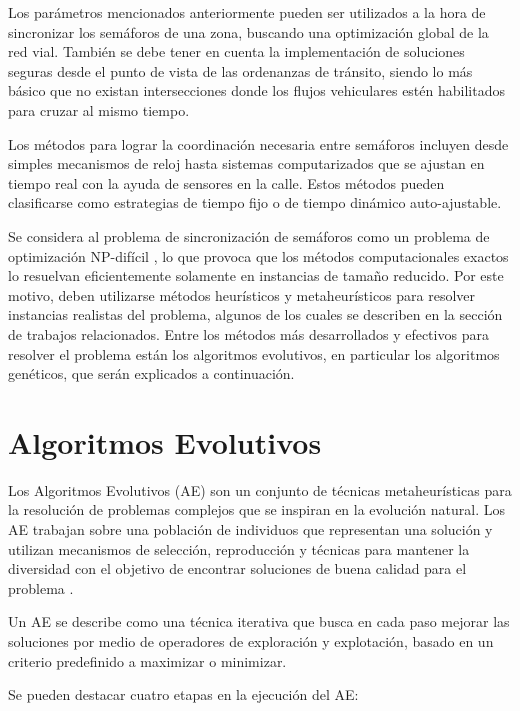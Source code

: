 Los parámetros mencionados anteriormente pueden ser utilizados a la hora de sincronizar los semáforos de una zona, buscando una optimización global de la red vial. También se debe tener en cuenta la implementación de soluciones seguras desde el punto de vista de las ordenanzas de tránsito, siendo lo más básico que no existan intersecciones donde los flujos vehiculares estén habilitados para cruzar al mismo tiempo.

Los métodos para lograr la coordinación necesaria entre semáforos incluyen desde simples mecanismos de reloj hasta sistemas computarizados que se ajustan en tiempo real con la ayuda de sensores en la calle. Estos métodos pueden clasificarse como estrategias de tiempo fijo o de tiempo dinámico auto-ajustable.

Se considera al problema de sincronización de semáforos como un problema de optimización NP-difícil \citep{yang1996model}, lo que provoca que los métodos computacionales exactos lo resuelvan eficientemente solamente en instancias de tamaño reducido. Por este motivo, deben utilizarse métodos heurísticos y metaheurísticos para resolver instancias realistas del problema, algunos de los cuales se describen en la sección de trabajos relacionados. Entre los métodos más desarrollados y efectivos para resolver el problema están los algoritmos evolutivos, en particular los algoritmos genéticos, que serán explicados a continuación.

\section{Algoritmos Evolutivos}

Los Algoritmos Evolutivos (AE) son un conjunto de técnicas metaheurísticas para la resolución de problemas complejos que se inspiran en la evolución natural. Los AE trabajan sobre una población de individuos que representan una solución y utilizan mecanismos de selección, reproducción y técnicas para mantener la diversidad con el objetivo de encontrar soluciones de buena calidad para el problema \citep{spears2000evolutionary}. 

Un AE se describe como una técnica iterativa que busca en cada paso mejorar las soluciones por medio de operadores de exploración y explotación, basado en un criterio predefinido a maximizar o minimizar.

Se pueden destacar cuatro etapas en la ejecución del AE:

